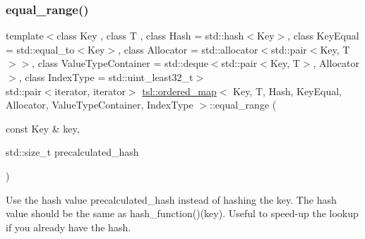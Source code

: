 \subsubsection{\texorpdfstring{equal\_range()}{equal\_range()}\hspace{0.1cm}{\footnotesize\ttfamily [1/6]}}
{\footnotesize\ttfamily template$<$class Key , class T , class Hash  = std\+::hash$<$\+Key$>$, class Key\+Equal  = std\+::equal\+\_\+to$<$\+Key$>$, class Allocator  = std\+::allocator$<$std\+::pair$<$\+Key, T$>$$>$, class Value\+Type\+Container  = std\+::deque$<$std\+::pair$<$\+Key, T$>$, Allocator$>$, class Index\+Type  = std\+::uint\+\_\+least32\+\_\+t$>$ \\
std\+::pair$<$iterator, iterator$>$ \mbox{\hyperlink{classtsl_1_1ordered__map}{tsl\+::ordered\+\_\+map}}$<$ Key, T, Hash, Key\+Equal, Allocator, Value\+Type\+Container, Index\+Type $>$\+::equal\+\_\+range (\begin{DoxyParamCaption}\item[{const Key \&}]{key,  }\item[{std\+::size\+\_\+t}]{precalculated\+\_\+hash }\end{DoxyParamCaption})\hspace{0.3cm}{\ttfamily [inline]}}

Use the hash value \textquotesingle{}precalculated\+\_\+hash\textquotesingle{} instead of hashing the key. The hash value should be the same as hash\+\_\+function()(key). Useful to speed-\/up the lookup if you already have the hash. \mbox{\label{classtsl_1_1ordered__map_a14b67de05a0a1d3e59468a0d64a0bc89}} 
